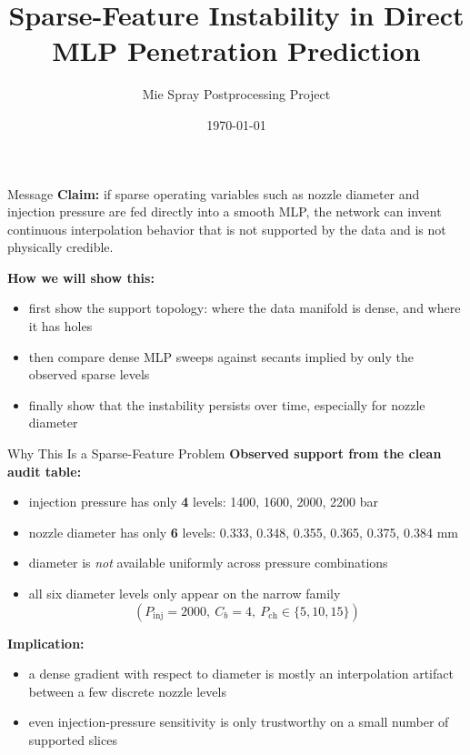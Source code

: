 \documentclass[UTF8,aspectratio=169]{ctexbeamer}
\title{Sparse-Feature Instability in Direct MLP Penetration Prediction}
\author{Mie Spray Postprocessing Project}
\date{\today}
\begin{document}
\begin{frame}
  \titlepage
\end{frame}

\begin{frame}{Message}
\textbf{Claim:} if sparse operating variables such as nozzle diameter and injection pressure are fed directly into a smooth MLP, the network can invent continuous interpolation behavior that is not supported by the data and is not physically credible.

\vspace{0.5em}
\textbf{How we will show this:}
\begin{itemize}
  \item first show the support topology: where the data manifold is dense, and where it has holes
  \item then compare dense MLP sweeps against secants implied by only the observed sparse levels
  \item finally show that the instability persists over time, especially for nozzle diameter
\end{itemize}
\end{frame}

\begin{frame}{Why This Is a Sparse-Feature Problem}
\textbf{Observed support from the clean audit table:}
\begin{itemize}
  \item injection pressure has only \textbf{4} levels: 1400, 1600, 2000, 2200 bar
  \item nozzle diameter has only \textbf{6} levels: 0.333, 0.348, 0.355, 0.365, 0.375, 0.384 mm
  \item diameter is \emph{not} available uniformly across pressure combinations
  \item all six diameter levels only appear on the narrow family
  \[
  (P_{\mathrm{inj}}=2000,\ C_b=4,\ P_{\mathrm{ch}}\in\{5,10,15\})
  \]
\end{itemize}

\vspace{0.4em}
\textbf{Implication:}
\begin{itemize}
  \item a dense gradient with respect to diameter is mostly an interpolation artifact between a few discrete nozzle levels
  \item even injection-pressure sensitivity is only trustworthy on a small number of supported slices
\end{itemize}
\end{frame}
\end{document}
